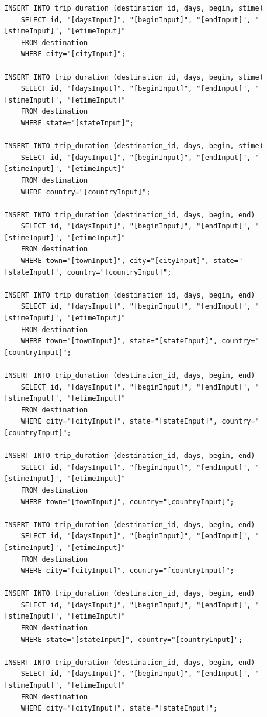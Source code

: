 \documentclass[letterpaper,10pt,onecolumn,compsoc]{IEEEtran}
\begin{document}
\begin{verbatim}
INSERT INTO trip_duration (destination_id, days, begin, stime) 
	SELECT id, "[daysInput]", "[beginInput]", "[endInput]", "[stimeInput]", "[etimeInput]" 
	FROM destination 
	WHERE city="[cityInput]";
	
INSERT INTO trip_duration (destination_id, days, begin, stime) 
	SELECT id, "[daysInput]", "[beginInput]", "[endInput]", "[stimeInput]", "[etimeInput]" 
	FROM destination 
	WHERE state="[stateInput]";
	
INSERT INTO trip_duration (destination_id, days, begin, stime) 
	SELECT id, "[daysInput]", "[beginInput]", "[endInput]", "[stimeInput]", "[etimeInput]" 
	FROM destination 
	WHERE country="[countryInput]";
	
INSERT INTO trip_duration (destination_id, days, begin, end) 
	SELECT id, "[daysInput]", "[beginInput]", "[endInput]", "[stimeInput]", "[etimeInput]" 
	FROM destination 
	WHERE town="[townInput]", city="[cityInput]", state="[stateInput]", country="[countryInput]";
	
INSERT INTO trip_duration (destination_id, days, begin, end) 
	SELECT id, "[daysInput]", "[beginInput]", "[endInput]", "[stimeInput]", "[etimeInput]" 
	FROM destination 
	WHERE town="[townInput]", state="[stateInput]", country="[countryInput]";
	
INSERT INTO trip_duration (destination_id, days, begin, end) 
	SELECT id, "[daysInput]", "[beginInput]", "[endInput]", "[stimeInput]", "[etimeInput]" 
	FROM destination 
	WHERE city="[cityInput]", state="[stateInput]", country="[countryInput]";
	
INSERT INTO trip_duration (destination_id, days, begin, end) 
	SELECT id, "[daysInput]", "[beginInput]", "[endInput]", "[stimeInput]", "[etimeInput]" 
	FROM destination 
	WHERE town="[townInput]", country="[countryInput]";
	
INSERT INTO trip_duration (destination_id, days, begin, end) 
	SELECT id, "[daysInput]", "[beginInput]", "[endInput]", "[stimeInput]", "[etimeInput]" 
	FROM destination 
	WHERE city="[cityInput]", country="[countryInput]";
	
INSERT INTO trip_duration (destination_id, days, begin, end) 
	SELECT id, "[daysInput]", "[beginInput]", "[endInput]", "[stimeInput]", "[etimeInput]" 
	FROM destination 
	WHERE state="[stateInput]", country="[countryInput]";
	
INSERT INTO trip_duration (destination_id, days, begin, end) 
	SELECT id, "[daysInput]", "[beginInput]", "[endInput]", "[stimeInput]", "[etimeInput]" 
	FROM destination 
	WHERE city="[cityInput]", state="[stateInput]";
	

\end{verbatim}
\end{document}
